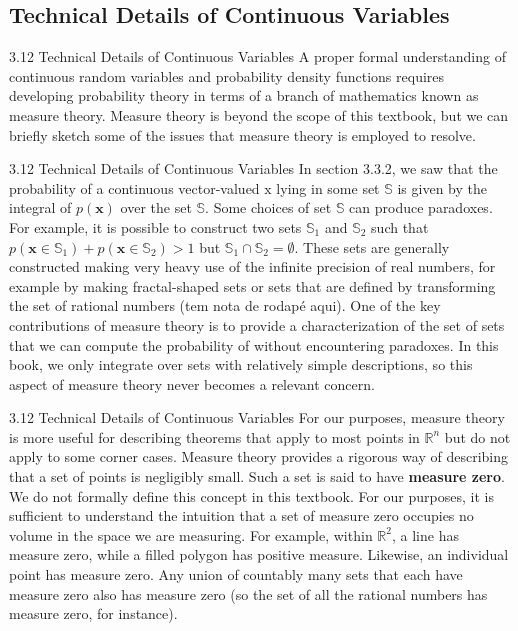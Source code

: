 \subsection{Technical Details of Continuous Variables}
\begin{frame}{3.12 Technical Details of Continuous Variables}
    \justifying
    A proper formal understanding of continuous random variables and probability density functions requires developing probability theory in terms of a branch of mathematics known as measure theory. Measure theory is beyond the scope of this textbook, but we can briefly sketch some of the issues that measure theory is employed to resolve.
\end{frame}

\begin{frame}{3.12 Technical Details of Continuous Variables}
    \justifying   
    In section 3.3.2, we saw that the probability of a continuous vector-valued $\boldsymbol{\mathrm{x}}$ lying in some set $\mathbb{S}$ is given by the integral of $p(\boldsymbol{x})$ over the set $\mathbb{S}$. Some choices of set $\mathbb{S}$ can produce paradoxes. For example, it is possible to construct two sets $\mathbb{S}_{1}$ and $\mathbb{S}_{2}$ such that $p(\boldsymbol{x} \in \mathbb{S}_{1}) + p(\boldsymbol{x} \in \mathbb{S}_{2}) > 1$ but $\mathbb{S}_{1} \cap \mathbb{S}_{2} = \emptyset$. These sets are generally constructed making very heavy use of the infinite precision of real numbers, for example by making fractal-shaped sets or sets that are defined by transforming the set of rational numbers (tem nota de rodap\'{e} aqui). One of the key contributions of measure theory is to provide a characterization of the set of sets that we can compute the probability of without encountering paradoxes. In this book, we only integrate over sets with relatively simple descriptions, so this aspect of measure theory never becomes a relevant concern.
\end{frame}

\begin{frame}{3.12 Technical Details of Continuous Variables}
    \justifying
    For our purposes, measure theory is more useful for describing theorems that apply to most points in $\mathbb{R}^{n}$ but do not apply to some corner cases. Measure theory provides a rigorous way of describing that a set of points is negligibly small. Such a set is said to have \textbf{measure zero}. We do not formally define this concept in this textbook. For our purposes, it is sufficient to understand the intuition that a set of measure zero occupies no volume in the space we are measuring. For example, within $\mathbb{R}^{2}$, a line has measure zero, while a filled polygon has positive measure. Likewise, an individual point has measure zero. Any union of countably many sets that each have measure zero also has measure zero (so the set of all the rational numbers has measure zero, for instance).
\end{frame}

